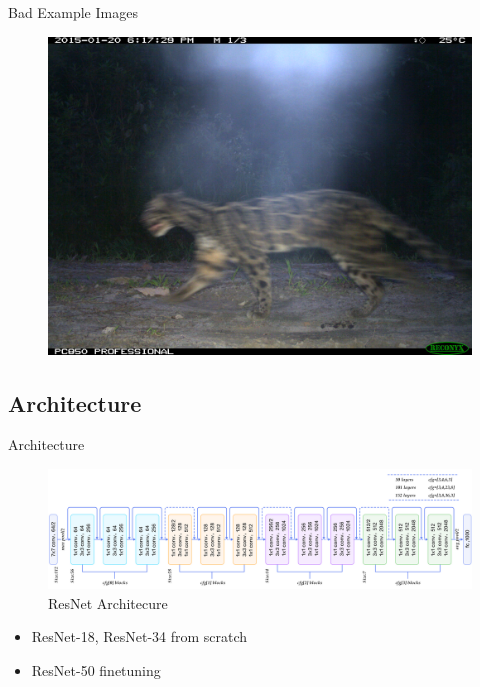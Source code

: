\documentclass[10pt]{beamer}
\begin{document}
\begin{frame}{Bad Example Images}
\begin{minipage}[c]{0.48\linewidth}
	\end{minipage}
	\hfill
	\begin{minipage}[c]{0.48\linewidth}
		\begin{figure}
			\includegraphics[width=\linewidth,height=\textheight,keepaspectratio]{images/example_bad_DFR_9_female.JPG}
		\end{figure}
	\end{minipage}
\end{frame}

\subsection{Architecture}

\begin{frame}{Architecture}
	\begin{figure}
		\includegraphics[width=\columnwidth]{images/resnet.png}
		\caption{ResNet Architecure}
	\end{figure}

	\begin{itemize}
		\item ResNet-18, ResNet-34 from scratch
		\item ResNet-50 finetuning
	\end{itemize}
\end{frame}
\end{document}
